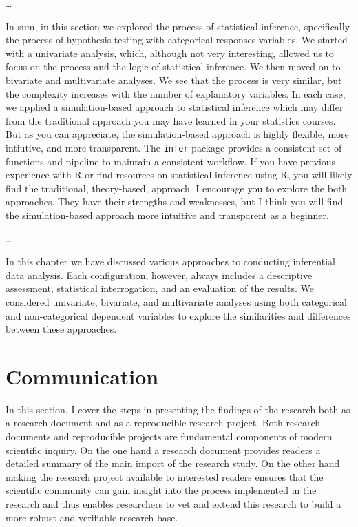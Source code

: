 \documentclass[
  letterpaper,
  DIV=11,
  numbers=noendperiod]{scrreprt}
\theoremstyle{definition}
\theoremstyle{remark}
\begin{document}

\ldots{}

In sum, in this section we explored the process of statistical
inference, specifically the process of hypothesis testing with
categorical responses variables. We started with a univariate analysis,
which, although not very interesting, allowed us to focus on the process
and the logic of statistical inference. We then moved on to bivariate
and multivariate analyses. We see that the process is very similar, but
the complexity increases with the number of explanatory variables. In
each case, we applied a simulation-based approach to statistical
inference which may differ from the traditional approach you may have
learned in your statistics courses. But as you can appreciate, the
simulation-based approach is highly flexible, more intiutive, and more
transparent. The \texttt{infer} package provides a consistent set of
functions and pipeline to maintain a consistent workflow. If you have
previous experience with R or find resources on statistical inference
using R, you will likely find the traditional, theory-based, approach. I
encourage you to explore the both approaches. They have their strengths
and weaknesses, but I think you will find the simulation-based approach
more intuitive and transparent as a beginner.

\ldots{}

In this chapter we have discussed various approaches to conducting
inferential data analysis. Each configuration, however, always includes
a descriptive assessment, statistical interrogation, and an evaluation
of the results. We considered univariate, bivariate, and multivariate
analyses using both categorical and non-categorical dependent variables
to explore the similarities and differences between these approaches.

\part{Communication}

In this section, I cover the steps in presenting the findings of the
research both as a research document and as a reproducible research
project. Both research documents and reproducible projects are
fundamental components of modern scientific inquiry. On the one hand a
research document provides readers a detailed summary of the main import
of the research study. On the other hand making the research project
available to interested readers ensures that the scientific community
can gain insight into the process implemented in the research and thus
enables researchers to vet and extend this research to build a more
robust and verifiable research base.
\end{document}
